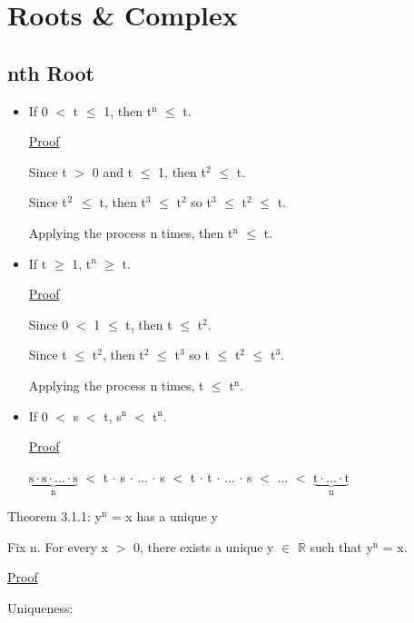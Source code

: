 \newpage
\section[Day 3: Roots and Complex]{Roots \& Complex}

\subsection{nth Root}

\begin{itemize}[leftmargin=1cm]
	\item If 0 $<$ t $\leq$ 1, then t$^\text{n}$ $ \leq $ t.

		{ \color{magenta} \underline{Proof} } 
		
		Since t $>$ 0 and t $\leq$ 1, then t$^\text{2}$ $\leq$ t.

		Since t$^\text2{}$ $\leq$ t, then t$^\text{3}$ $\leq$ t$^\text{2}$
		so t$^\text{3}$ $\leq$ t$^\text{2}$ $\leq$ t.

		Applying the process n times, then t$^\text{n}$ $\leq$ t.

	\item If t $\geq$ 1, t$^\text{n}$ $ \geq $ t.

		{ \color{magenta} \underline{Proof} } 
		
		Since 0 $<$ 1 $\leq$ t, then t $\leq$ t$^\text{2}$.

		Since t $\leq$ t$^\text{2}$, then t$^\text{2}$ $\leq$ t$^\text{3}$
		so t $\leq$ t$^\text{2}$ $\leq$ t$^\text{3}$.

		Applying the process n times, t $\leq$ t$^\text{n}$.

	\item If 0 $<$ s $<$ t, s$^\text{n}$ $<$ t$^\text{n}$.

		{ \color{magenta} \underline{Proof} } 
		
		$\underbrace{\text{s} \cdot \text{s} \cdot ... \cdot \text{s}}_\text{n}$
		$<$ t $\cdot$ s $\cdot$ ... $\cdot$ s
		$<$ t $\cdot$ t $\cdot$ ... $\cdot$ s $<$ ... $<$
		$\underbrace{\text{t} \cdot ... \cdot \text{t}}_\text{n}$
\end{itemize}


{ \color{blue} Theorem 3.1.1: y$^\text{n}$ = x has a unique y }

\qquad Fix n. For every x $>$ 0, there exists a unique y $\in$ $ \mathbb{R} $ such that
	y$^\text{n}$ = x.

{ \color{magenta} \underline{Proof} } 

{ \color{lblue} Uniqueness: }

